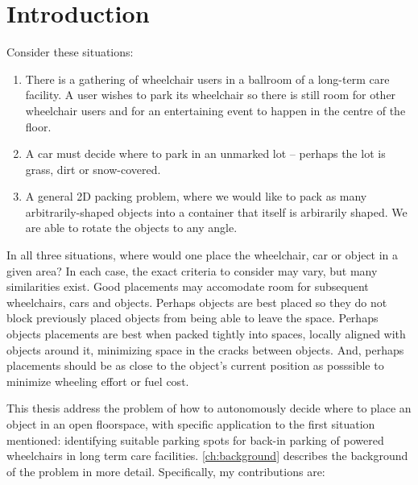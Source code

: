 


\chapter{Introduction}
\label{ch:Introduction}

Consider these situations:
\begin{enumerate}
\item There is a gathering of wheelchair users in a ballroom of a long-term care
facility. A user wishes to park its wheelchair so there is still room for other
wheelchair users and for an entertaining event to happen in the centre of the
floor.
\item A car must decide where to park in an unmarked lot -- perhaps the lot is
grass, dirt or snow-covered.
\item A general 2D packing problem, where we would like to pack as many
arbitrarily-shaped objects into a container that itself is arbirarily shaped. We
are able to rotate the objects to any angle.
\end{enumerate}

In all three situations, where would one place the wheelchair, car or object in
a given area? In each case, the exact criteria to consider may vary, but many
similarities exist.  Good placements may accomodate room for subsequent
wheelchairs, cars and objects. Perhaps objects are best placed so they do not
block previously placed objects from being able to leave the space. Perhaps
objects placements are best when packed tightly into spaces, locally aligned
with objects around it, minimizing space in the cracks between objects. And,
perhaps placements should be as close to the object's current position as
posssible to minimize wheeling effort or fuel cost.

This thesis address the problem of how to autonomously decide where to
place an object in an open floorspace, with specific application to the first
situation mentioned: identifying suitable parking spots for back-in parking of
powered wheelchairs in long term care facilities. 
\autoref{ch:background} describes the background of the problem in more detail.
Specifically, my contributions are:

